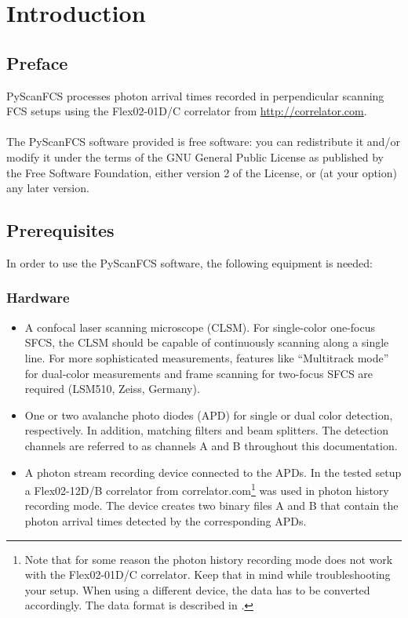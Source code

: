 
\section{Introduction}

\subsection{Preface}
PyScanFCS processes photon arrival times recorded in perpendicular scanning FCS setups using the Flex02-01D/C correlator from \url{http://correlator.com}.
\\
\\
The PyScanFCS software provided is free software: you can redistribute it and/or modify it
under the terms of the GNU General Public License as published 
by the Free Software Foundation, either version 2 of the License, 
or (at your option) any later version.

\subsection{Prerequisites}
In order to use the PyScanFCS software, the following equipment is needed:

\subsubsection*{Hardware}
\begin{itemize}
\item A confocal laser scanning microscope (CLSM). For single-color one-focus SFCS, the CLSM should be capable of continuously scanning along a single line. For more sophisticated measurements, features like ``Multitrack mode'' for dual-color measurements and frame scanning for two-focus SFCS are required (LSM510, Zeiss, Germany).

\item One or two avalanche photo diodes (APD) for single or dual color detection, respectively. In addition, matching filters and beam splitters. The detection channels are referred to as channels A and B throughout this documentation.

\item A photon stream recording device connected to the APDs. In the tested setup a Flex02-12D/B correlator from correlator.com\footnote{Note that for some reason the photon history recording mode does not work with the Flex02-01D/C correlator. Keep that in mind while troubleshooting your setup. When using a different device, the data has to be converted accordingly. The data format is described in .} was used in photon history recording mode. The device creates two binary files A and B that contain the photon arrival times detected by the corresponding APDs.
\end{itemize}

